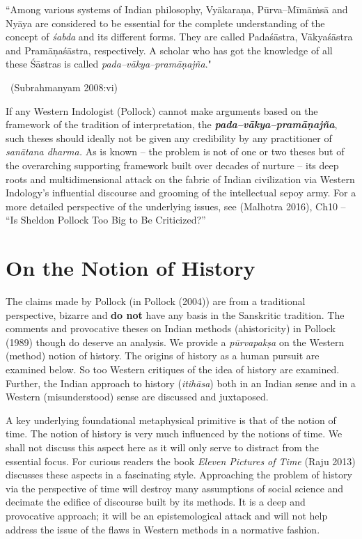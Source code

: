 \begin{myquote}
“Among various systems of Indian philosophy, Vyākaraṇa, Pūrva–Mīmāṁsā and Nyāya are considered to be essential for the complete understanding of the concept of \textit{śabda} and its different forms. They are called Padaśāstra, Vākyaśāstra and Pramāṇaśāstra, respectively. A scholar who has got the knowledge of all these Śāstras is called \textit{pada–vākya–pramāṇajña}." 

~\hfill (Subrahmanyam 2008:vi)
\end{myquote}

If any Western Indologist (Pollock) cannot make arguments based on the framework of the tradition of interpretation, the \textit{\textbf{pada–vākya–pramāṇajña}}, such theses should ideally not be given any credibility by any practitioner of \textit{sanātana dharma.} As is known – the problem is not of one or two theses but of the overarching supporting framework built over decades of nurture – its deep roots and multidimensional attack on the fabric of Indian civilization via Western Indology’s influential discourse and grooming of the intellectual sepoy army. For a more detailed perspective of the underlying issues, see (Malhotra 2016), Ch10 – “Is Sheldon Pollock Too Big to Be Criticized?”


\section*{On the Notion of History}

The claims made by Pollock (in Pollock (2004)) are from a traditional perspective, bizarre and \textbf{do not} have any basis in the Sanskritic tradition. The comments and provocative theses on Indian methods (ahistoricity) in Pollock (1989) though do deserve an analysis. We provide a \textit{pūrvapakṣa} on the Western (method) notion of history. The origins of history as a human pursuit are examined below. So too Western critiques of the idea of history are examined. Further, the Indian approach to history (\textit{itihāsa}) both in an Indian sense and in a Western (misunderstood) sense are discussed and juxtaposed.

A key underlying foundational metaphysical primitive is that of the notion of time. The notion of history is very much influenced by the notions of time. We shall not discuss this aspect here as it will only serve to distract from the essential focus. For curious readers the book \textit{Eleven Pictures of Time} (Raju 2013) discusses these aspects in a fascinating style. Approaching the problem of history via the perspective of time will destroy many assumptions of social science and decimate the edifice of discourse built by its methods. It is a deep and provocative approach; it will be an epistemological attack and will not help address the issue of the flaws in Western methods in a normative fashion.


